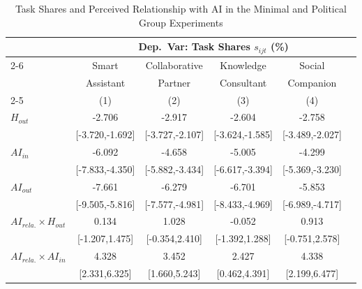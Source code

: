 \begin{table}[htbp]
\centering
\caption{Task Shares and Perceived Relationship with AI in the Minimal and Political Group Experiments}
\label{tab:ai_relation}
\scriptsize
\begin{threeparttable}
\begin{tabular}{l*{5}{c}}
\toprule\toprule
 & \multicolumn{5}{c}{Dep.\ Var: Task Shares $s_{ijt}$ (\%)} \\
\cmidrule(lr){2-6}
 & Smart & Collaborative & Knowledge & Social & \\
 & Assistant & Partner & Consultant & Companion & \\
\cmidrule(lr){2-5}
 & (1) & (2) & (3) & (4) & \\
\midrule
\midrule
$H_{out}$   &                -2.706\sym{***}&                -2.917\sym{***}&                -2.604\sym{***}&                -2.758\sym{***}\\
            &       [-3.720,-1.692]         &       [-3.727,-2.107]         &       [-3.624,-1.585]         &       [-3.489,-2.027]         \\
\addlinespace
$AI_{in}$   &                -6.092\sym{***}&                -4.658\sym{***}&                -5.005\sym{***}&                -4.299\sym{***}\\
            &       [-7.833,-4.350]         &       [-5.882,-3.434]         &       [-6.617,-3.394]         &       [-5.369,-3.230]         \\
\addlinespace
$AI_{out}$  &                -7.661\sym{***}&                -6.279\sym{***}&                -6.701\sym{***}&                -5.853\sym{***}\\
            &       [-9.505,-5.816]         &       [-7.577,-4.981]         &       [-8.433,-4.969]         &       [-6.989,-4.717]         \\
\addlinespace
$AI_{rela.} \times H_{out}$&                 0.134         &                 1.028         &                -0.052         &                 0.913         \\
            &        [-1.207,1.475]         &        [-0.354,2.410]         &        [-1.392,1.288]         &        [-0.751,2.578]         \\
\addlinespace
$AI_{rela.} \times AI_{in}$&                 4.328\sym{***}&                 3.452\sym{***}&                 2.427\sym{*}  &                 4.338\sym{***}\\
            &         [2.331,6.325]         &         [1.660,5.243]         &         [0.462,4.391]         &         [2.199,6.477]         \\

\end{tabular}
\end{threeparttable}
\end{table}
